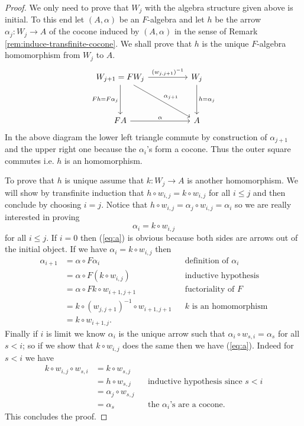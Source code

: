 \documentclass[letterpaper, 11pt, oneside]{memoir}
\theoremstyle{myteo}
\numberwithin{equation}{section}
\begin{document}
\begin{proof}
  We only need to prove that \(W_j\) with the algebra structure given above is initial.
  To this end let \((A, \alpha)\) be an \(F\)-algebra and let \(h\) be the arrow \(\alpha_j : W_j \to A\) of the cocone induced by \((A, \alpha)\) in the sense of Remark \ref{rem:induce-transfinite-cocone}.
  We shall prove that \(h\) is the unique \(F\)-algebra homomorphism from \(W_j\) to \(A\).
  \begin{equation*}
    \begin{tikzcd}[sep=huge]
      W_{j+1} = FW_j \ar[r, "(w_{j,j+1})^{-1}"] \ar[d, "Fh = F\alpha_j"'] \ar[dr, "\alpha_{j+1}"] & W_j \ar[d, "h = \alpha_j"]\\
      FA \ar[r, "\alpha"] & A
    \end{tikzcd}
  \end{equation*}
  In the above diagram the lower left triangle commute by construction of \(\alpha_{j+1}\) and the upper right one because the \(\alpha_i\)'s form a cocone.
  Thus the outer square commutes i.e. \(h\) is an homomorphism.

  To prove that \(h\) is unique assume that \(k : W_j \to A\) is another homomorphism.
  We will show by transfinite induction that \(h \circ w_{i, j} = k \circ w_{i, j}\) for all \(i \leq j\) and then conclude by choosing \(i = j\).
  Notice that \(h \circ w_{i, j} = \alpha_j \circ w_{i, j} = \alpha_i\) so we are really interested in proving
  \begin{equation}
    \label{eq:a}
    \alpha_i = k \circ w_{i, j}
  \end{equation}
  for all \(i \leq j\).
  If \(i = 0\) then (\ref{eq:a}) is obvious because both sides are arrows out of the initial object.
  If we have \(\alpha_i = k \circ w_{i, j}\) then
  \begin{align*}
    \alpha_{i+1} &= \alpha \circ F\alpha_i && \text{definition of \(\alpha_i\)}\\
            &= \alpha \circ F(k \circ w_{i, j}) && \text{inductive hypothesis}\\
            &= \alpha \circ Fk \circ w_{i+1, j+1} && \text{fuctoriality of \(F\)}\\
            &= k \circ (w_{j,j+1})^{-1} \circ w_{i+1, j+1} && \text{\(k\) is an homomorphism}\\
            &= k \circ w_{i+1, j}.
  \end{align*}
  Finally if \(i\) is limit we know \(\alpha_i\) is the unique arrow such that \(\alpha_i \circ w_{s,i} = \alpha_s\) for all \(s < i\); so if we show that \(k \circ w_{i, j}\) does the same then we have (\ref{eq:a}).
  Indeed for \(s < i\) we have
  \begin{align*}
    k \circ w_{i, j} \circ w_{s, i} &= k \circ w_{s, j} && \\
                            &= h \circ w_{s, j} && \text{inductive hypothesis since \(s < i\)}\\
                            &= \alpha_j \circ w_{s, j} && \\
                            &= \alpha_s && \text{the \(\alpha_i\)'s are a cocone}.
  \end{align*}
  This concludes the proof.
\end{proof}
\end{document}
